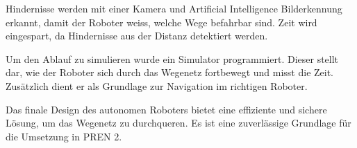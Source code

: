 Hindernisse werden mit einer Kamera und Artificial Intelligence Bilderkennung erkannt, damit der Roboter weiss, welche Wege befahrbar sind. Zeit wird eingespart, da Hindernisse aus der Distanz detektiert werden.

Um den Ablauf zu simulieren wurde ein Simulator programmiert. Dieser stellt dar, wie der Roboter sich durch das Wegenetz fortbewegt und misst die Zeit. Zusätzlich dient er als Grundlage zur Navigation im richtigen Roboter.

Das finale Design des autonomen Roboters bietet eine effiziente und sichere Lösung, um das Wegenetz zu durchqueren. Es ist eine zuverlässige Grundlage für die Umsetzung in PREN 2.


